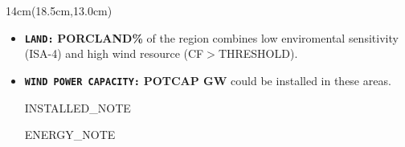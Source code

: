 \documentclass{article}
\begin{document}
\begin{textblock*}{14cm}(18.5cm,13.0cm)
\begin{tcolorbox}[colback=fondo,colframe=black,boxrule=0.5pt,arc=5pt,left=0pt,right=15pt,top=15pt,bottom=15pt]
\large
    \begin{itemize}
        \item \texttt{\textbf{LAND:}} {\color{low}\textbf{PORCLAND\%}} of the region combines low enviromental sensitivity (ISA-4) and high wind resource (CF$>$THRESHOLD). \vspace{0.4cm}
        
        \item \texttt{\textbf{WIND POWER CAPACITY:}} {\color{low}\textbf{POTCAP GW}} could be installed in these areas.

            INSTALLED_NOTE

        ENERGY_NOTE
    \end{itemize}
\end{tcolorbox}
\end{textblock*}
\end{document}
